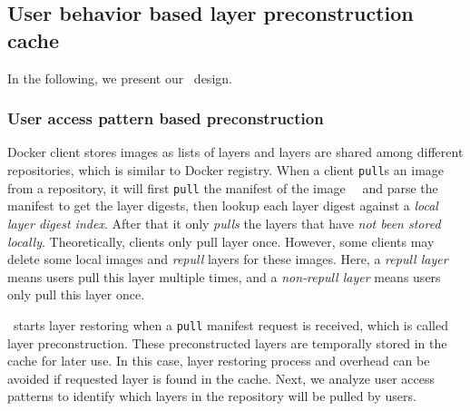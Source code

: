 
\subsection{User behavior based layer preconstruction cache}
\label{sec:cache-design}

In the following, we present our \sysname~\preconstructcachename design.


\subsubsection{User access pattern based preconstruction}

Docker client stores images as lists of layers and layers are shared among different repositories, which is similar to Docker registry.
When a client \texttt{pull}s an image from a repository, 
it will first \texttt{pull} the manifest of the image~\cite{docker}~\cite{dockerworkload} and 
parse the manifest to get the layer digests,
then lookup each layer digest against a \emph{local layer digest index}.
After that it only \emph{pulls} the layers that have \emph{not been stored locally}.
Theoretically, clients only pull layer once. 
However, some clients may delete some local images and \emph{repull} layers for these images.
Here, a \emph{repull layer} means users pull this layer multiple times,
and a \emph{non-repull layer} means users only pull this layer once.

\preconstructcachename~starts layer restoring when a \texttt{pull} manifest request is received, which is called layer preconstruction.
These preconstructed layers are temporally stored in the cache for later use.
In this case, layer restoring process and overhead can be avoided if requested layer is found in the cache.
Next, we analyze user access patterns to identify which layers in the repository will be pulled by users.

